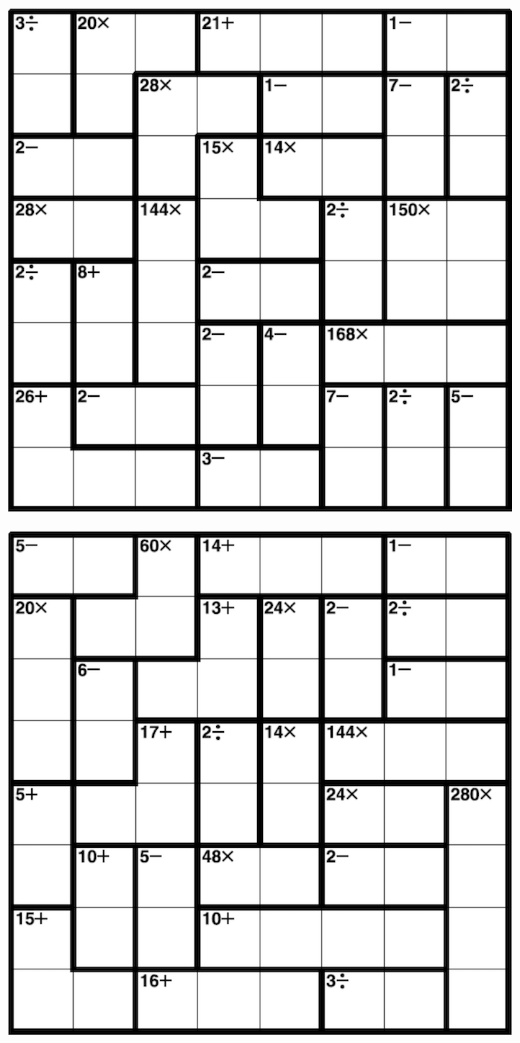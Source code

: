
\includegraphics[scale=1]{Gambar/Lampiran/8x8_1.png}

\includegraphics[scale=1]{Gambar/Lampiran/8x8_2.png}

